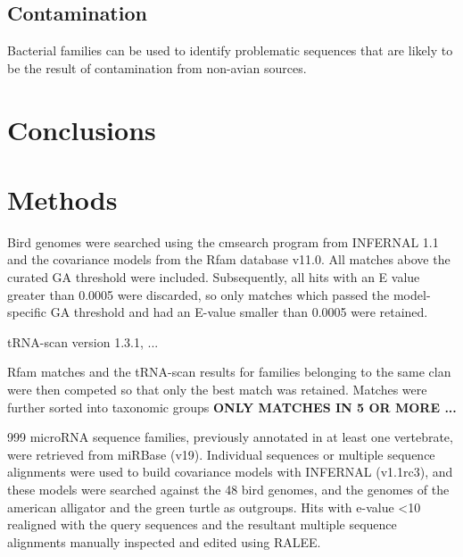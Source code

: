\documentclass[10pt]{bmc_article}
\newenvironment{bmcformat}{\begin{raggedright}\baselineskip20pt\sloppy\setboolean{publ}{false}}{\end{raggedright}\baselineskip20pt\sloppy}
\begin{document}
\begin{bmcformat}


\subsection*{Contamination}

Bacterial families can be used to identify problematic sequences that
are likely to be the result of contamination from non-avian sources.


\section*{Conclusions}



\section*{Methods}

Bird genomes were searched using the cmsearch program from INFERNAL
1.1 and the covariance models from the Rfam database
v11.0\cite{Griffiths-Jones:2003,Griffiths-Jones:2005,Gardner:2009,Gardner:2011a,Burge:2013}. All
matches above the curated GA threshold were included. Subsequently,
all hits with an E value greater than 0.0005 were discarded, so only
matches which passed the model-specific GA threshold and had an E-value smaller than 0.0005 were retained.

tRNA-scan version 1.3.1, ... \cite{Lowe:1997,Chan:2009}

Rfam matches and the tRNA-scan results for families belonging to the
same clan were then competed so that only the best match was retained.
Matches were further sorted into taxonomic groups {\bf ONLY MATCHES IN 5 OR MORE ...}

999 microRNA sequence families, previously annotated in at least one
vertebrate, were retrieved from miRBase (v19). Individual sequences or
multiple sequence alignments were used to build covariance models with
INFERNAL (v1.1rc3), and these models were searched against the 48 bird
genomes, and the genomes of the american alligator and the green
turtle as outgroups. Hits with e-value <10 realigned with the query
sequences and the resultant multiple sequence alignments manually
inspected and edited using RALEE.


\end{bmcformat}
\end{document}

